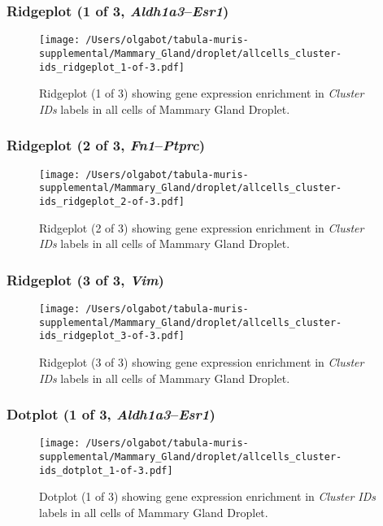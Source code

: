 \clearpage

\subsubsection{Ridgeplot (1 of 3, \emph{Aldh1a3}--\emph{Esr1})}
\begin{figure}[h]
\centering
\texttt{[image: /Users/olgabot/tabula-muris-supplemental/Mammary\_Gland/droplet/allcells\_cluster-ids\_ridgeplot\_1-of-3.pdf]}

\caption{ Ridgeplot (1 of 3)  showing gene expression enrichment in \emph{Cluster IDs} labels in all cells of Mammary Gland Droplet. }
\end{figure}


\clearpage

\subsubsection{Ridgeplot (2 of 3, \emph{Fn1}--\emph{Ptprc})}
\begin{figure}[h]
\centering
\texttt{[image: /Users/olgabot/tabula-muris-supplemental/Mammary\_Gland/droplet/allcells\_cluster-ids\_ridgeplot\_2-of-3.pdf]}

\caption{ Ridgeplot (2 of 3)  showing gene expression enrichment in \emph{Cluster IDs} labels in all cells of Mammary Gland Droplet. }
\end{figure}


\clearpage

\subsubsection{Ridgeplot (3 of 3, \emph{Vim})}
\begin{figure}[h]
\centering
\texttt{[image: /Users/olgabot/tabula-muris-supplemental/Mammary\_Gland/droplet/allcells\_cluster-ids\_ridgeplot\_3-of-3.pdf]}

\caption{ Ridgeplot (3 of 3)  showing gene expression enrichment in \emph{Cluster IDs} labels in all cells of Mammary Gland Droplet. }
\end{figure}


\clearpage

\subsubsection{Dotplot (1 of 3, \emph{Aldh1a3}--\emph{Esr1})}
\begin{figure}[h]
\centering
\texttt{[image: /Users/olgabot/tabula-muris-supplemental/Mammary\_Gland/droplet/allcells\_cluster-ids\_dotplot\_1-of-3.pdf]}

\caption{ Dotplot (1 of 3)  showing gene expression enrichment in \emph{Cluster IDs} labels in all cells of Mammary Gland Droplet. }
\end{figure}


